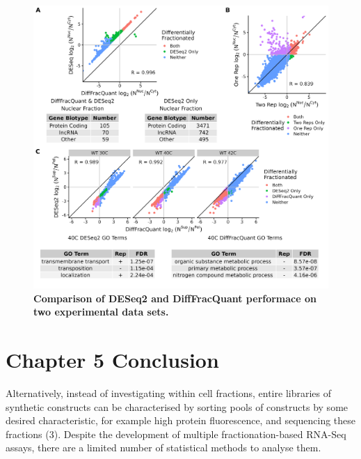 \documentclass[../main.tex]{subfiles}
\begin{document}
\begin{figure}[h]

{\centering \includegraphics[width=1\linewidth]{figures/DESeq_vs_bayesian_encode_and_iserman_combined.png} 

}

\caption[Experimental data performance.]{\textbf{Comparison of DESeq2 and DiffFracQuant performace on two experimental data sets.}} \label{fig:encode-iserman-data-results}
\end{figure}





\section{Chapter 5 Conclusion}


Alternatively, instead of investigating within cell fractions, entire libraries of synthetic constructs can be characterised by sorting pools of constructs by some desired characteristic, for example high protein fluorescence, and sequencing these fractions (3). 
Despite the development of multiple fractionation-based RNA-Seq assays, there are a limited number of statistical methods to analyse them. 
\end{document}
